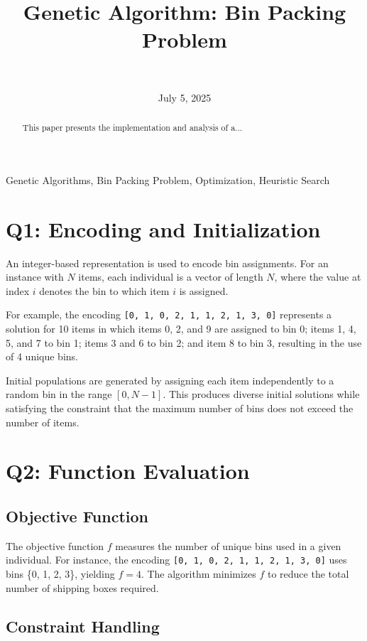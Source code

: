 \documentclass[journal,12pt,onecolumn]{IEEEtran}
\title{Genetic Algorithm: Bin Packing Problem}
\author{
   \IEEEauthorblockN{Matthew D. Branson} \\
   \IEEEauthorblockA{\textit{Department of Computer Science} \\
   \textit{Missouri State University}\\
   Springfield, MO \\
   branson773@live.missouristate.edu
   }
}
\date{July 5, 2025}
\begin{document}
\maketitle

\begin{abstract}
This paper presents the implementation and analysis of a...
\end{abstract}

\begin{IEEEkeywords}
Genetic Algorithms, Bin Packing Problem, Optimization, Heuristic Search
\end{IEEEkeywords}

\section{Q1: Encoding and Initialization}

An integer-based representation is used to encode bin assignments. For an instance with $N$ items, each individual is a vector of length $N$, where the value at index $i$ denotes the bin to which item $i$ is assigned.

For example, the encoding \texttt{[0, 1, 0, 2, 1, 1, 2, 1, 3, 0]} represents a solution for 10 items in which items 0, 2, and 9 are assigned to bin 0; items 1, 4, 5, and 7 to bin 1; items 3 and 6 to bin 2; and item 8 to bin 3, resulting in the use of 4 unique bins.

Initial populations are generated by assigning each item independently to a random bin in the range $[0, N-1]$. This produces diverse initial solutions while satisfying the constraint that the maximum number of bins does not exceed the number of items.

\section{Q2: Function Evaluation}

\subsection{Objective Function}

The objective function $f$ measures the number of unique bins used in a given individual. For instance, the encoding \texttt{[0, 1, 0, 2, 1, 1, 2, 1, 3, 0]} uses bins \{0, 1, 2, 3\}, yielding $f = 4$. The algorithm minimizes $f$ to reduce the total number of shipping boxes required.

\subsection{Constraint Handling}
\end{document}
